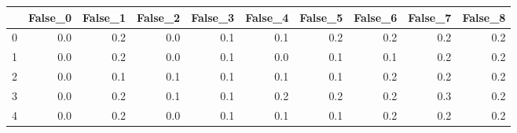 \begin{tabular}{lrrrrrrrrr}
\toprule
{} &  False\_0 &  False\_1 &  False\_2 &  False\_3 &  False\_4 &  False\_5 &  False\_6 &  False\_7 &  False\_8 \\ \hline
\midrule
0 &      0.0 &      0.2 &      0.0 &      0.1 &      0.1 &      0.2 &      0.2 &      0.2 &      0.2 \\ \hline
1 &      0.0 &      0.2 &      0.0 &      0.1 &      0.0 &      0.1 &      0.1 &      0.2 &      0.2 \\ \hline
2 &      0.0 &      0.1 &      0.1 &      0.1 &      0.1 &      0.1 &      0.2 &      0.2 &      0.2 \\ \hline
3 &      0.0 &      0.2 &      0.1 &      0.1 &      0.2 &      0.2 &      0.2 &      0.3 &      0.2 \\ \hline
4 &      0.0 &      0.2 &      0.0 &      0.1 &      0.1 &      0.1 &      0.2 &      0.2 &      0.2 \\ \hline
\bottomrule
\end{tabular}
